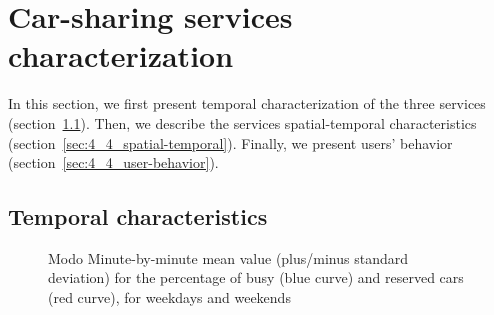 \section{Car-sharing services characterization} 
\label{sec:4_4_characterization}

In this section, we first present temporal characterization of the three services (section~\ref{sec:4_4_temporal_characterization}). Then, we describe the services spatial-temporal characteristics (section~\ref{sec:4_4_spatial-temporal}). Finally, we present users' behavior (section~\ref{sec:4_4_user-behavior}).

\subsection{Temporal characteristics}
\label{sec:4_4_temporal_characterization}


\begin{figure}
	\centering
	\qquad
	\caption{Modo Minute-by-minute mean value (plus/minus standard deviation) for  the  percentage of busy (blue curve) and reserved cars (red curve), for weekdays and weekends}
	\label{fig:4_4_modo_busy}%
\end{figure}


